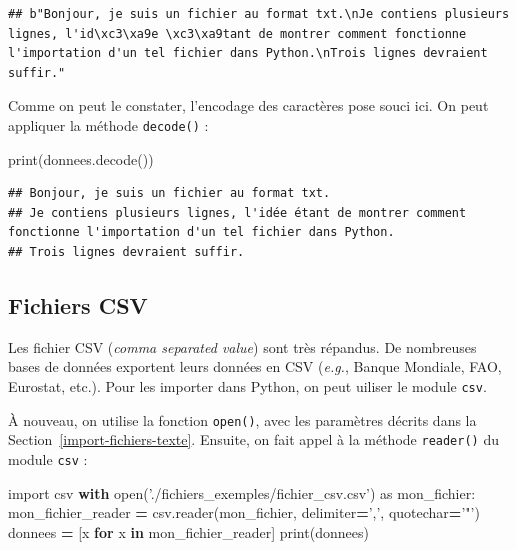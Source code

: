 \documentclass[12pt,]{book}
\newenvironment{Shaded}{\begin{snugshade}}{\end{snugshade}}
\newcommand{\KeywordTok}[1]{\textcolor[rgb]{0.13,0.29,0.53}{\textbf{#1}}}
\newcommand{\StringTok}[1]{\textcolor[rgb]{0.31,0.60,0.02}{#1}}
\newcommand{\ImportTok}[1]{#1}
\newcommand{\ControlFlowTok}[1]{\textcolor[rgb]{0.13,0.29,0.53}{\textbf{#1}}}
\newcommand{\OperatorTok}[1]{\textcolor[rgb]{0.81,0.36,0.00}{\textbf{#1}}}
\newcommand{\BuiltInTok}[1]{#1}
\newcommand{\NormalTok}[1]{#1}
\numberwithin{equation}{section}
\numberwithin{countremarque}{section}
\begin{document}
\begin{lstlisting}
## b"Bonjour, je suis un fichier au format txt.\nJe contiens plusieurs lignes, l'id\xc3\xa9e \xc3\xa9tant de montrer comment fonctionne l'importation d'un tel fichier dans Python.\nTrois lignes devraient suffir."
\end{lstlisting}

Comme on peut le constater, l'encodage des caractères pose souci ici. On
peut appliquer la méthode \texttt{decode()} :

\begin{Shaded}
\begin{Highlighting}[]
\BuiltInTok{print}\NormalTok{(donnees.decode())}
\end{Highlighting}
\end{Shaded}

\begin{lstlisting}
## Bonjour, je suis un fichier au format txt.
## Je contiens plusieurs lignes, l'idée étant de montrer comment fonctionne l'importation d'un tel fichier dans Python.
## Trois lignes devraient suffir.
\end{lstlisting}

\subsection{Fichiers CSV}\label{fichiers-csv}

Les fichier CSV (\emph{comma separated value}) sont très répandus. De
nombreuses bases de données exportent leurs données en CSV (\emph{e.g.},
Banque Mondiale, FAO, Eurostat, etc.). Pour les importer dans Python, on
peut uiliser le module \texttt{csv}.

À nouveau, on utilise la fonction \texttt{open()}, avec les paramètres
décrits dans la Section~\ref{import-fichiers-texte}. Ensuite, on fait
appel à la méthode \texttt{reader()} du module \texttt{csv} :

\begin{Shaded}
\begin{Highlighting}[]
\ImportTok{import}\NormalTok{ csv}
\ControlFlowTok{with} \BuiltInTok{open}\NormalTok{(}\StringTok{'./fichiers_exemples/fichier_csv.csv'}\NormalTok{) }\ImportTok{as}\NormalTok{ mon_fichier:}
\NormalTok{  mon_fichier_reader }\OperatorTok{=}\NormalTok{ csv.reader(mon_fichier, delimiter}\OperatorTok{=}\StringTok{','}\NormalTok{, quotechar}\OperatorTok{=}\StringTok{'"'}\NormalTok{)}
\NormalTok{  donnees }\OperatorTok{=}\NormalTok{ [x }\ControlFlowTok{for}\NormalTok{ x }\KeywordTok{in}\NormalTok{ mon_fichier_reader]}
\BuiltInTok{print}\NormalTok{(donnees)}
\end{Highlighting}
\end{Shaded}
\end{document}
